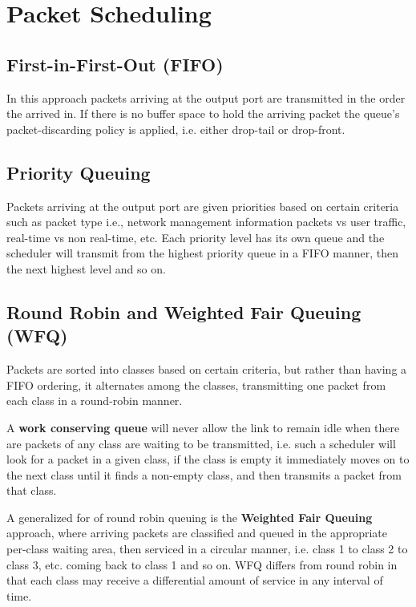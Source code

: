 \documentclass[12pt letter]{report}
\begin{document}
\section{Packet Scheduling}

\subsection{First-in-First-Out (FIFO)}

In this approach packets arriving at the output port are transmitted
in the order the arrived in. If there is no buffer space to hold the
arriving packet the queue's packet-discarding policy is applied, i.e.
either drop-tail or drop-front.

\subsection{Priority Queuing}

Packets arriving at the output port are given priorities based on
certain criteria such as packet type i.e., network management
information packets vs user traffic, real-time vs non real-time, etc.
Each priority level has its own queue and the scheduler will transmit
from the highest priority queue in a FIFO manner, then the next
highest level and so on.

\subsection{Round Robin and Weighted Fair Queuing (WFQ)}

Packets are sorted into classes based on certain criteria, but rather
than having a FIFO ordering, it alternates among the classes,
transmitting one packet from each class in a round-robin manner.

A \textbf{work conserving queue} will never allow the link to remain
idle when there are packets of any class are waiting to be
transmitted, i.e. such a scheduler will look for a packet in a given
class, if the class is empty it immediately moves on to the next
class until it finds a non-empty class, and then transmits a packet
from that class.

A generalized for of round robin queuing is the \textbf{Weighted Fair
Queuing} approach, where arriving packets are classified and queued
in the appropriate per-class waiting area, then serviced in a
circular manner, i.e. class 1 to class 2 to class 3, etc. coming back
to class 1 and so on. WFQ differs from round robin in that each class
may receive a differential amount of service in any interval of time.
\end{document}
